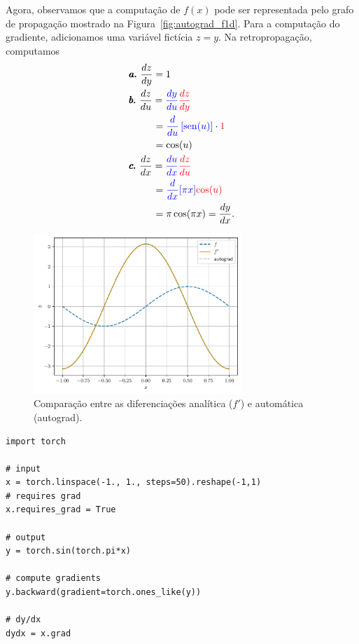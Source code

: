 \begin{ex}
  Agora, observamos que a computação de $f(x)$ pode ser representada pelo grafo de propagação mostrado na Figura~\ref{fig:autograd_f1d}. Para a computação do gradiente, adicionamos uma variável fictícia $z = y$. Na retropropagação, computamos
  \begin{subequations}
    \begin{align}
      &\pmb{a.} ~\frac{dz}{dy} = 1\\
      &\pmb{b.} ~\frac{dz}{du} = {\color{blue}\frac{dy}{du}}{\color{red}\frac{dz}{dy}}\nonumber\\
      &\qquad\;\, = {\color{blue}\frac{d}{du}\left[\operatorname{sen}(u)\right]}\cdot {\color{red}1}\nonumber\\
      &\qquad\;\, = \cos(u)\\
      &\pmb{c.} ~\frac{dz}{dx} = {\color{blue}\frac{du}{dx}}{\color{red}\frac{dz}{du}}\\
      &\qquad\;\, = {\color{blue}\frac{d}{dx}[\pi x]}{\color{red}\cos(u)}\\
      &\qquad\;\, = \pi\cos(\pi x) = \frac{dy}{dx}.
    \end{align}
  \end{subequations}

  \begin{figure}[H]
    \centering
    \includegraphics[width=0.7\textwidth]{cap_mlp/dados/ex_mlp_autograd_df1d/fig}
    \caption{Comparação entre as diferenciações analítica ($f'$) e automática (autograd).}
    \label{fig:ex_mlp_autograd_df1d}
  \end{figure}

\begin{lstlisting}[caption=mlp\_autograd\_df1d, label=cod:ex_mlp_atograd_df1d]
import torch

# input
x = torch.linspace(-1., 1., steps=50).reshape(-1,1)
# requires grad
x.requires_grad = True

# output
y = torch.sin(torch.pi*x)

# compute gradients
y.backward(gradient=torch.ones_like(y))

# dy/dx
dydx = x.grad
\end{lstlisting}
\end{ex}

